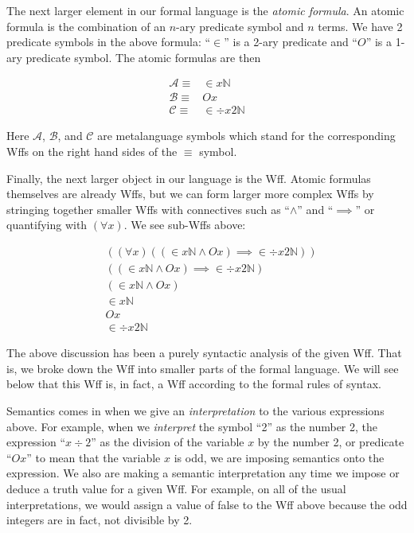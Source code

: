 \documentclass[12pt]{article}
\newcommand{\mc}[1]{\mathcal{#1}}
\newcommand{\qq}[1]{``#1''}
\begin{document}
The next larger element in our formal language is the \textit{atomic formula}.
An atomic formula is the combination of an $n$-ary predicate symbol and $n$ terms.
We have 2 predicate symbols in the above formula: \qq{$\in$} is a 2-ary predicate and \qq{$O$} is a 1-ary predicate symbol.
The atomic formulas are then

\begin{align}
\mc{A} \equiv& \in x \mathbb{N}\\
\mc{B} \equiv& Ox\\
\mc{C} \equiv& \in \div x2 \mathbb{N}
\end{align}

Here $\mc{A}$, $\mc{B}$, and $\mc{C}$ are metalanguage symbols which stand for the corresponding Wffs on the right hand sides of the $\equiv$ symbol.

Finally, the next larger object in our language is the Wff.
Atomic formulas themselves are already Wffs, but we can form larger more complex Wffs by stringing together smaller Wffs with connectives such as \qq{$\land$} and \qq{$\implies$} or quantifying with $(\forall x)$.
We see sub-Wffs above:

\begin{align}
& ((\forall x)((\in x \mathbb{N} \land Ox)\implies \in \div x 2 \mathbb{N})) \\
& ((\in x \mathbb{N} \land Ox)\implies \in \div x 2 \mathbb{N}) \\
& (\in x \mathbb{N} \land Ox)\\
& \in x \mathbb{N}\\
& Ox \\
&  \in \div x 2 \mathbb{N}
\end{align}

The above discussion has been a purely syntactic analysis of the given Wff.
That is, we broke down the Wff into smaller parts of the formal language.
We will see below that this Wff is, in fact, a Wff according to the formal rules of syntax.

Semantics comes in when we give an \textit{interpretation} to the various expressions above.
For example, when we \textit{interpret} the symbol \qq{2} as the number 2, the expression \qq{$x \div 2$} as the division of the variable $x$ by the number 2, or predicate \qq{$Ox$} to mean that the variable $x$ is odd, we are imposing semantics onto the expression.
We also are making a semantic interpretation any time we impose or deduce a truth value for a given Wff.
For example, on all of the usual interpretations, we would assign a value of false to the Wff above because the odd integers are in fact, not divisible by 2.
\end{document}
